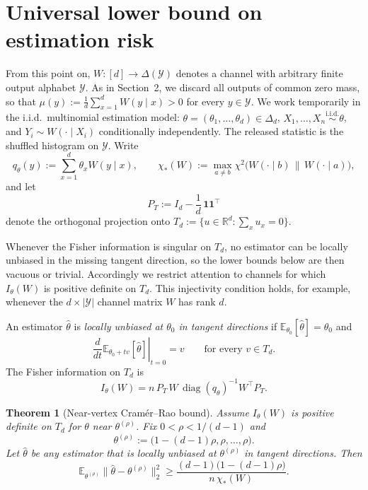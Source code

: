 \documentclass[11pt]{amsart}
\numberwithin{equation}{section}
\newtheorem{theorem}{Theorem}[section]
\theoremstyle{definition}
\newcommand{\R}{\mathbb R}
\newcommand{\E}{\mathbb E}
\newcommand{\one}{\mathbf 1}
\newcommand{\iid}{\stackrel{\mathrm{i.i.d.}}{\sim}}
\DeclareMathOperator{\diag}{diag}
\begin{document}
\section{Universal lower bound on estimation risk}\label{sec:estimation-lower}

From this point on, \(W:[d]\to\Delta(\mathcal Y)\) denotes a channel with arbitrary finite output alphabet
\(\mathcal Y\).
As in Section~2, we discard all outputs of common zero mass, so that
\(\mu(y):=\frac{1}{d}\sum_{x=1}^d W(y\mid x)>0\) for every \(y\in\mathcal Y\).
We work temporarily in the i.i.d.\ multinomial estimation model:
\(\theta=(\theta_1,\dots,\theta_d)\in\Delta_d\),
\(X_1,\dots,X_n \iid \theta\), and
\(Y_i\sim W(\cdot\mid X_i)\) conditionally independently.
The released statistic is the shuffled histogram on \(\mathcal Y\).
Write
\[
q_\theta(y):=\sum_{x=1}^d \theta_x W(y\mid x),
\qquad
\chi_\ast(W):=\max_{a\neq b}\chi^2\!\bigl(W(\cdot\mid b)\,\|\,W(\cdot\mid a)\bigr),
\]
and let
\[
P_T:=I_d-\frac1d\,\one\one^\top
\]
denote the orthogonal projection onto
\(
T_d:=\{u\in\R^d:\sum_x u_x=0\}.
\)

Whenever the Fisher information is singular on \(T_d\), no estimator can be locally unbiased in the missing
tangent direction, so the lower bounds below are then vacuous or trivial.
Accordingly we restrict attention to channels for which \(I_\theta(W)\) is positive definite on \(T_d\).
This injectivity condition holds, for example, whenever the \(d\times |\mathcal Y|\) channel matrix \(W\)
has rank \(d\).

An estimator \(\widehat\theta\) is \emph{locally unbiased at \(\theta_0\) in tangent directions} if
\(\E_{\theta_0}[\widehat\theta]=\theta_0\) and
\[
\left.\frac{d}{dt}\E_{\theta_0+tv}[\widehat\theta]\right|_{t=0}=v
\qquad\text{for every } v\in T_d.
\]
The Fisher information on \(T_d\) is
\[
I_\theta(W)
=
n\,P_T\,W\,\diag(q_\theta)^{-1}W^\top P_T. \tag{8.1}\label{eq:fisher-general}
\]

\begin{theorem}[Near-vertex Cram\'er--Rao bound]\label{thm:near-vertex-cr}
Assume \(I_{\theta}(W)\) is positive definite on \(T_d\) for \(\theta\) near \(\theta^{(\rho)}\).
Fix \(0<\rho<1/(d-1)\) and
\[
\theta^{(\rho)}:=\bigl(1-(d-1)\rho,\rho,\dots,\rho\bigr).
\]
Let \(\widehat\theta\) be any estimator that is locally unbiased at \(\theta^{(\rho)}\) in tangent
directions.
Then
\[
\E_{\theta^{(\rho)}}\bigl\|\widehat\theta-\theta^{(\rho)}\bigr\|_2^2
\ge
\frac{(d-1)\bigl(1-(d-1)\rho\bigr)}{n\,\chi_\ast(W)}. \tag{8.2}\label{eq:near-vertex-cr}
\]
\end{theorem}
\end{document}
